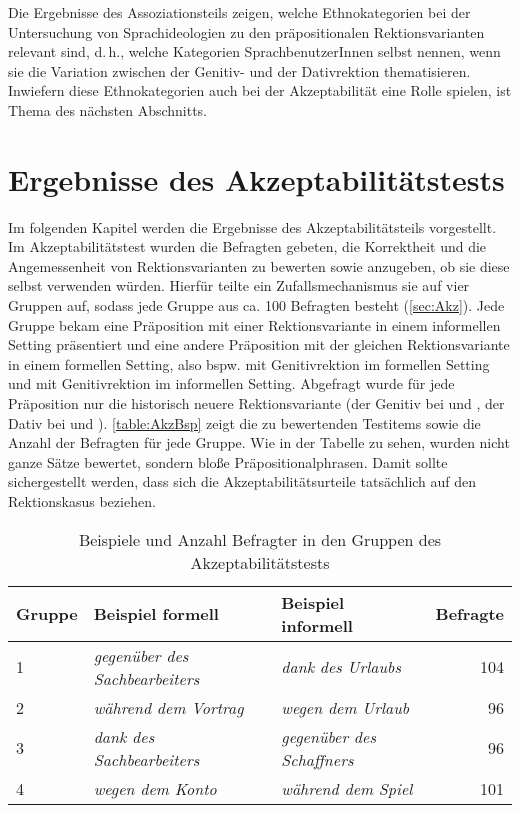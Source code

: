 Die Ergebnisse des Assoziationsteils zeigen, welche Ethnokategorien bei der Untersuchung von Sprachideologien zu den präpositionalen Rektionsvarianten relevant sind, d.\,h., welche Kategorien SprachbenutzerInnen selbst nennen, wenn sie die Variation zwischen der Genitiv- und der Dativrektion thematisieren. 
Inwiefern diese Ethnokategorien auch bei der Akzeptabilität eine Rolle spielen, ist Thema des nächsten Abschnitts. 
\section{Ergebnisse des Akzeptabilitätstests}
\label{sec:ErgAkz}
Im folgenden Kapitel werden die Ergebnisse des Akzeptabilitätsteils vorgestellt. 
Im Akzeptabilitätstest wurden die Befragten gebeten, die Korrektheit und die Angemessenheit von Rektionsvarianten zu bewerten sowie anzugeben, ob sie diese selbst verwenden würden. 
Hierfür teilte ein Zufallsmechanismus sie auf vier Gruppen auf, sodass jede Gruppe aus ca. 100 Befragten besteht (\autoref{sec:Akz}). 
Jede Gruppe bekam eine Präposition mit einer Rektionsvariante in einem informellen Setting präsentiert und eine andere Präposition mit der gleichen Rektionsvariante in einem formellen Setting, also bspw. \dank{} mit Genitivrektion im formellen Setting und \gegenueber{} mit Genitivrektion im informellen Setting. 
Abgefragt wurde für jede Präposition nur die historisch neuere Rektionsvariante (der Genitiv bei \dank{} und \gegenueber{}, der Dativ bei \wegen{} und \waehrend{}). \autoref{table:AkzBsp} zeigt die zu bewertenden Testitems sowie die Anzahl der Befragten für jede Gruppe.
Wie in der Tabelle zu sehen, wurden nicht ganze Sätze bewertet, sondern bloße Präpositionalphrasen.
Damit sollte sichergestellt werden, dass sich die Akzeptabilitätsurteile tatsächlich auf den Rektionskasus beziehen. 
\begin{table}
\centering
\begin{tabular}{lllr}
\textbf{Gruppe} & \textbf{Beispiel formell}              & \textbf{Beispiel informell}       & \textbf{Befragte} \\ \hline
1               & \textit{gegenüber des Sachbearbeiters} & \textit{dank des Urlaubs}         &          104         \\ %
2               & \textit{während dem Vortrag}           & \textit{wegen dem Urlaub}         &       96            \\ %
3               & \textit{dank des Sachbearbeiters}      & \textit{gegenüber des Schaffners} &     96          \\ %
4               & \textit{wegen dem Konto}            & \textit{während dem Spiel}          &     101           
\end{tabular}
\caption{Beispiele und Anzahl Befragter in den Gruppen des Akzeptabilitätstests}
\label{table:AkzBsp}
\end{table}

